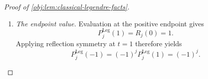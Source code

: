 \begin{proof}[Proof of \cref{obj:lem:classical-legendre-facts}]
\begin{enumerate}
Differentiation of the energy, followed by substitution of this differential equation, yields
\[
\begin{aligned}
\mathcal E_j'(x)
&=2R_j(x)R_j'(x)
+\frac{(1-2x)R_j'(x)^2
       +2x(1-x)R_j'(x)R_j''(x)}{\lambda_j}\\
&=(2x-1)\frac{R_j'(x)^2}{\lambda_j}.
\end{aligned}
\]
Thus the energy is nonincreasing on \([0,1/2]\) and nondecreasing on \([1/2,1]\). Its endpoint values are
\[
\mathcal E_j(0)=R_j(0)^2=1,
\qquad
\mathcal E_j(1)=R_j(1)^2=1.
\]
For \(x\le1/2\), compare with the left endpoint; for \(x>1/2\), compare with the right endpoint. These comparisons give
\[
\mathcal E_j(x)\le
\begin{cases}
\mathcal E_j(0),&0\le x\le1/2,\\
\mathcal E_j(1),&1/2<x\le1,
\end{cases}
\qquad
\mathcal E_j(x)\le1.
\]
Since the additional term in the energy is nonnegative on the unit interval,
\[
R_j(x)^2
\le R_j(x)^2+\frac{x(1-x)R_j'(x)^2}{\lambda_j}
=\mathcal E_j(x)\le1,
\qquad 0\le x\le1.
\]
Hence \(|R_j(x)|\le1\) throughout that interval. Finally,
\[
-1\le t\le1
\quad\Longrightarrow\quad
0\le\frac{1-t}{2}\le1
\quad\Longrightarrow\quad
|P_j^{\mathrm{Leg}}(t)|
=\left|R_j\!\left(\frac{1-t}{2}\right)\right|\le1.
\]

\item \emph{The endpoint value.}
Evaluation at the positive endpoint gives
\[
P_j^{\mathrm{Leg}}(1)=R_j(0)=1.
\]
Applying reflection symmetry at \(t=1\) therefore yields
\[
P_j^{\mathrm{Leg}}(-1)
=(-1)^jP_j^{\mathrm{Leg}}(1)
=(-1)^j.
\]
\end{enumerate}
\end{proof}

